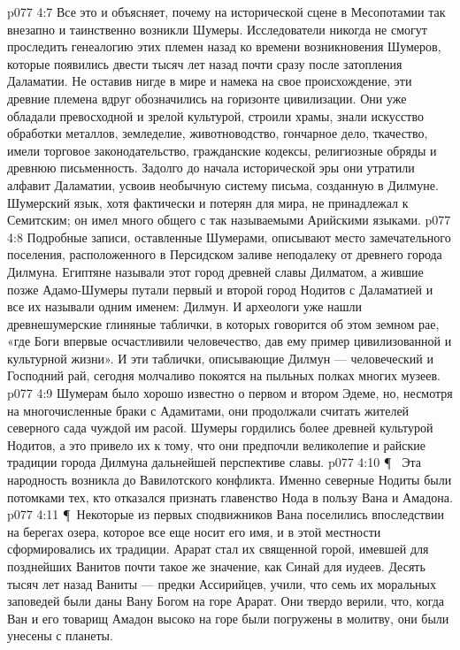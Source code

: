 \vs p077 4:7 Все это и объясняет, почему на исторической сцене в Месопотамии так внезапно и таинственно возникли Шумеры. Исследователи никогда не смогут проследить генеалогию этих племен назад ко времени возникновения Шумеров, которые появились двести тысяч лет назад почти сразу после затопления Даламатии. Не оставив нигде в мире и намека на свое происхождение, эти древние племена вдруг обозначились на горизонте цивилизации. Они уже обладали превосходной и зрелой культурой, строили храмы, знали искусство обработки металлов, земледелие, животноводство, гончарное дело, ткачество, имели торговое законодательство, гражданские кодексы, религиозные обряды и древнюю письменность. Задолго до начала исторической эры они утратили алфавит Даламатии, усвоив необычную систему письма, созданную в Дилмуне. Шумерский язык, хотя фактически и потерян для мира, не принадлежал к Семитским; он имел много общего с так называемыми Арийскими языками.
\vs p077 4:8 Подробные записи, оставленные Шумерами, описывают место замечательного поселения, расположенного в Персидском заливе неподалеку от древнего города Дилмуна. Египтяне называли этот город древней славы Дилматом, а жившие позже Адамо\hyp{}Шумеры путали первый и второй город Нодитов с Даламатией и все их называли одним именем: Дилмун. И археологи уже нашли древнешумерские глиняные таблички, в которых говорится об этом земном рае, «где Боги впервые осчастливили человечество, дав ему пример цивилизованной и культурной жизни». И эти таблички, описывающие Дилмун --- человеческий и Господний рай, сегодня молчаливо покоятся на пыльных полках многих музеев.
\vs p077 4:9 Шумерам было хорошо известно о первом и втором Эдеме, но, несмотря на многочисленные браки с Адамитами, они продолжали считать жителей северного сада чуждой им расой. Шумеры гордились более древней культурой Нодитов, а это привело их к тому, что они предпочли великолепие и райские традиции города Дилмуна дальнейшей перспективе славы.
\vs p077 4:10 \P\ \bibnobreakspace {} Эта народность возникла до Вавилотского конфликта. Именно северные Нодиты были потомками тех, кто отказался признать главенство Нода в пользу Вана и Амадона.
\vs p077 4:11 \P\ Некоторые из первых сподвижников Вана поселились впоследствии на берегах озера, которое все еще носит его имя, и в этой местности сформировались их традиции. Арарат стал их священной горой, имевшей для позднейших Ванитов почти такое же значение, как Синай для иудеев. Десять тысяч лет назад Ваниты --- предки Ассирийцев, учили, что семь их моральных заповедей были даны Вану Богом на горе Арарат. Они твердо верили, что, когда Ван и его товарищ Амадон высоко на горе были погружены в молитву, они были унесены с планеты.
